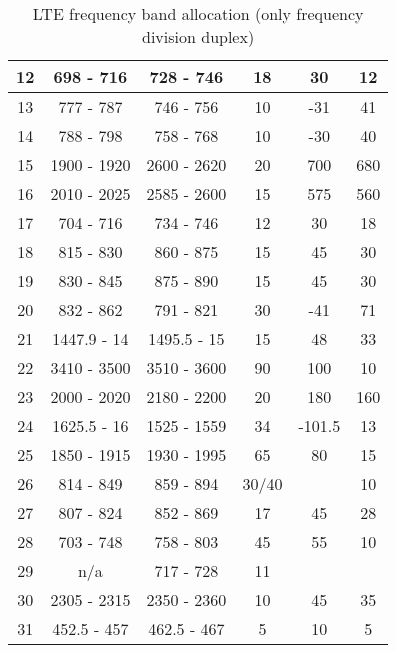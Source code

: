 \begin{table}[]
\begin{tabular}{|c|c|c|c|c|c|}
    12 & 698 - 716   & 728 - 746   & 18 & 30  & 12  \\ \hline
    13 & 777 - 787   & 746 - 756   & 10 & -31  & 41  \\ \hline
    14 & 788 - 798   & 758 - 768   & 10 & -30  & 40  \\ \hline
    15 & 1900 - 1920 & 2600 - 2620 & 20 & 700  & 680  \\ \hline
    16 & 2010 - 2025 & 2585 - 2600 & 15 & 575 & 560 \\ \hline
    17 & 704 - 716   & 734 - 746   & 12 & 30  & 18  \\ \hline
    18 & 815 - 830   & 860 - 875   & 15 & 45  & 30  \\ \hline
    19 & 830 - 845   & 875 - 890   & 15 & 45  & 30  \\ \hline
    20 & 832 - 862   & 791 - 821   & 30 & -41  & 71  \\ \hline
    21 & 1447.9 - 14 & 1495.5 - 15 & 15 & 48  & 33  \\ \hline
    22 & 3410 - 3500 & 3510 - 3600 & 90 & 100  & 10  \\ \hline
    23 & 2000 - 2020 & 2180 - 2200 & 20 & 180  & 160  \\ \hline
    24 & 1625.5 - 16 & 1525 - 1559 & 34 & -101.5  & 13  \\ \hline
    25 & 1850 - 1915 & 1930 - 1995 & 65 & 80  & 15  \\ \hline
    26 & 814 - 849   & 859 - 894   & 30/40 &     & 10  \\ \hline
    27 & 807 - 824   & 852 - 869   & 17 & 45  & 28  \\ \hline
    28 & 703 - 748   & 758 - 803   & 45 & 55  & 10  \\ \hline
    29 & n/a         & 717 - 728   & 11 &     &     \\ \hline
    30 & 2305 - 2315 & 2350 - 2360 & 10 & 45  & 35  \\ \hline
    31 & 452.5 - 457 & 462.5 - 467 & 5  & 10  & 5   \\ \hline
  \end{tabular}
  \caption{LTE frequency band allocation (only frequency division duplex) \cite{radio2015electronics}}
  \label{tab:ltefreqband}
\end{table}

